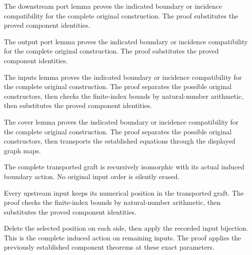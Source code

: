 The downstream port lemma proves the indicated boundary or incidence compatibility for the complete original construction.
The proof substitutes the proved component identities.
\par{}

The output port lemma proves the indicated boundary or incidence compatibility for the complete original construction.
The proof substitutes the proved component identities.
\par{}

The inputs lemma proves the indicated boundary or incidence compatibility for the complete original construction.
The proof separates the possible original constructors, then checks the finite-index bounds by natural-number arithmetic, then substitutes the proved component identities.
\par{}

The cover lemma proves the indicated boundary or incidence compatibility for the complete original construction.
The proof separates the possible original constructors, then transports the established equations through the displayed graph maps.
\par{}

The complete transported graft is recursively isomorphic with its
actual induced boundary action. No original input order is silently erased.
\par{}

Every upstream input keeps its numerical position in the transported graft.
The proof checks the finite-index bounds by natural-number arithmetic, then substitutes the proved component identities.
\par{}

Delete the selected position on each side, then apply the recorded
input bijection. This is the complete induced action on remaining inputs.
The proof applies the previously established component theorems at these exact parameters.
\par{}

